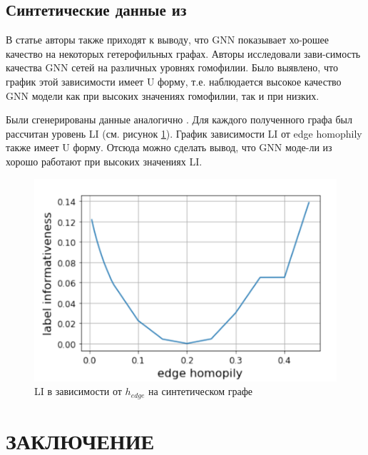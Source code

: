 \documentclass[a4paper,14pt]{article}
\begin{document}
	
	\subsection{Синтетические данные из \cite{luan2021heterophily}}
	
	В  статье \cite{luan2021heterophily} авторы также приходят к выводу, что GNN показывает хо-рошее качество на некоторых гетерофильных графах.
	Авторы исследовали зави-симость качества GNN сетей на различных уровнях гомофилии.
	Было выявлено, что график этой зависимости имеет U форму, т.е. наблюдается высокое качество GNN модели как при высоких значениях гомофилии, так и при низких.
	
	Были сгенерированы данные аналогично \cite{luan2021heterophily}. Для каждого полученного графа был рассчитан уровень LI (см. рисунок \ref{fig:label-informativeness-depending-on-edge-homophily}).
	График зависимости LI от edge homophily также имеет U форму.
	Отсюда можно сделать вывод, что GNN моде-ли из \cite{luan2021heterophily} хорошо работают при высоких значениях LI.
	
	\begin{figure}[H]
		\centering
		\includegraphics[width=0.4\linewidth]{"images/Label informativeness depending on edge homophily"}
		\caption{LI в зависимости от $h_{edge}$ на синтетическом графе \cite{luan2021heterophily}}
		\label{fig:label-informativeness-depending-on-edge-homophily}
	\end{figure}
	
	
	\pagebreak
	
	\section*{ \hfill ЗАКЛЮЧЕНИЕ \hfill}
	
    \pagebreak
    \renewcommand{\refname}{{ \hfill СПИСОК ИСПОЛЬЗОВАННЫХ ИСТОЧНИКОВ \hfill}}
%    
    
    
    \newpage
\end{document}
